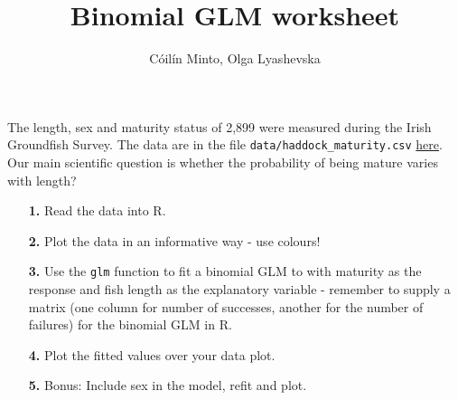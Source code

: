 \documentclass[a4paper,12pt]{article}
\title{Binomial GLM worksheet}
\author{C\'oil\'in Minto, Olga Lyashevska}
\date{}
\begin{document}
\maketitle

\noindent 
The length, sex and maturity status of 2,899 were measured during the Irish Groundfish Survey. The data are in the file \texttt{data/haddock\_maturity.csv} \href{https://github.com/mintoc/mfrc-stats}{here}.\\ 

Our main scientific question is whether the probability of being mature varies with length?

\vspace{1cm}
\begin{itemize}
 \item[{\bf 1.}] Read the data into R.
 \item[{\bf 2.}] Plot the data in an informative way - use colours!
 \item[{\bf 3.}] Use the \texttt{glm} function to fit a binomial GLM to with maturity as the response and fish length as the explanatory variable - remember to supply a matrix (one column for number of successes, another for the number of failures) for the binomial GLM in R.
 \item[{\bf 4.}] Plot the fitted values over your data plot.
 \item[{\bf 5.}] Bonus: Include sex in the model, refit and plot.
\end{itemize}
\end{document}
